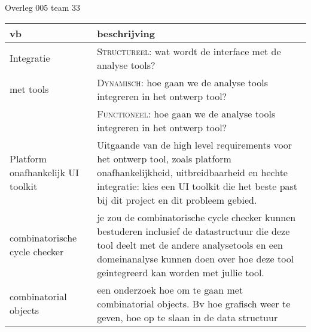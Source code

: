 \documentclass{article}
\begin{document}
\begin{Minutes}{Overleg 005 team 33}
\begin{center}
    \begin{tabular}{|p{2.5cm}|p{10cm}|}
    \hline
        {\bf vb}		& {\bf beschrijving} \\\hline
        Integratie		& \textsc{Structureel}: wat wordt de interface met de analyse tools? \\
	met tools 		& \textsc{Dynamisch}: hoe gaan we de analyse tools integreren in het ontwerp tool?\\
				& \textsc{Functioneel}: hoe gaan we de analyse tools integreren in het ontwerp tool?\\\hline
        Platform onafhankelijk UI toolkit & Uitgaande van de high level requirements voor het ontwerp
					    tool, zoals platform onafhankelijkheid, uitbreidbaarheid
					    en hechte integratie: kies een UI toolkit die het
					    beste past bij dit project en dit probleem gebied.\\\hline
        combinatorische cycle checker & je zou de combinatorische cycle checker kunnen bestuderen inclusief de datastructuur die
					deze tool deelt met de andere analysetools en een domeinanalyse kunnen doen
					over hoe deze tool geintegreerd kan worden met jullie tool.\\\hline
         combinatorial objects &  een onderzoek hoe om te gaan met combinatorial objects.
				    Bv hoe grafisch weer te geven, hoe op te slaan in de data structuur\\\hline
    \end{tabular}

\end{center}

\end{Minutes}
\end{document}

